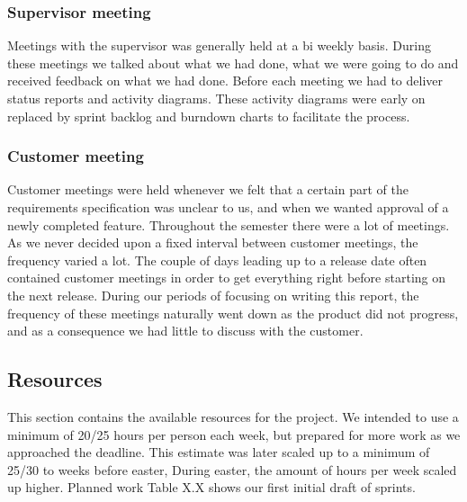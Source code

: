 \subsubsection{Supervisor meeting}
Meetings with the supervisor was generally held at a bi weekly basis.
During these meetings we talked about what we had done, what we were
going to do and received feedback on what we had done. Before each
meeting we had to deliver status reports and activity diagrams. These
activity diagrams were early on replaced by sprint backlog and burndown
charts to facilitate the process. 

\subsubsection{Customer meeting}
Customer meetings were held whenever we felt that a certain part of the
requirements specification was unclear to us, and when we wanted
approval of a newly completed feature. Throughout the semester there
were a lot of meetings. As we never decided upon a fixed interval
between customer meetings, the frequency varied a lot. The couple of
days leading up to a release date often contained customer meetings in
order to get everything right before starting on the next release.
During our periods of focusing on writing this report, the frequency of
these meetings naturally went down as the product did not progress, and
as a consequence we had little to discuss with the customer. 

\subsection{Resources}
This section contains the available resources for the project. We
intended to use a minimum of 20/25 hours per person each week, but
prepared for more work as we approached the deadline. This estimate was
later scaled up to a minimum of 25/30 to weeks before easter, During
easter, the amount of hours per week scaled up higher.
Planned work 
Table X.X shows our first initial draft of sprints. 

